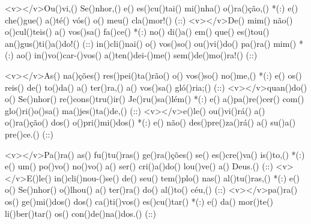 <v></v>Ou()vi,() Se()nhor,() e() es()cu()tai() mi()nha() o()ra()ção,() *(:)
e() che()gue() a()té() vós() o() meu() cla()mor!() (::)
<v></v>De() mim() não() o()cul()teis() a() vos()sa() fa()ce() *(:)
no() di()a() em() que() es()tou() an()gus()ti()a()do!() (::)
in()cli()nai() o() vos()so() ou()vi()do() pa()ra() mim() *(:)
ao() in()vo()car-()vos() a()ten()dei-()me() sem()de()mo()ra!() (::)

<v></v>As() na()ções() res()pei()ta()rão() o() vos()so() no()me,() *(:)
e() os() reis() de() to()da() a() ter()ra,() a() vos()sa() gló()ria;() (::)
<v></v>quan()do() o() Se()nhor() re()cons()tru()ir() Je()ru()sa()lém() *(:)
e() a()pa()re()cer() com() glo()ri()o()sa() ma()jes()ta()de,() (::)
<v></v>e()le() ou()vi()rá() a() o()ra()ção() dos() o()pri()mi()dos() *(:)
e() não() des()pre()za()rá() a() su()a() pre()ce.() (::)

<v></v>Pa()ra() as() fu()tu()ras() ge()ra()ções() se() es()cre()va() is()to,() *(:)
e() um() po()vo() no()vo() a() ser() cri()a()do() lou()ve() a() Deus.() (::)
<v></v>E()le() in()cli()nou-()se() de() seu() tem()plo() nas() al()tu()ras,() *(:)
e() o() Se()nhor() o()lhou() a() ter()ra() do() al()to() céu,() (::)
<v></v>pa()ra() os() ge()mi()dos() dos() ca()ti()vos() es()cu()tar() *(:)
e() da() mor()te() li()ber()tar() os() con()de()na()dos.() (::)